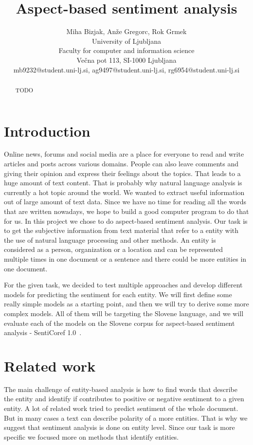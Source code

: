 \documentclass[11pt,a4paper]{article}
\title{Aspect-based sentiment analysis}
\author{
    Miha Bizjak, Anže Gregorc, Rok Grmek \\
    University of Ljubljana \\
    Faculty for computer and information science \\
    Večna pot 113, SI-1000 Ljubljana \\
    mb9232@student.uni-lj.si, ag9497@student.uni-lj.si, rg6954@student.uni-lj.si
}
\date{}
\begin{document}
\maketitle



\begin{abstract}
    TODO
\end{abstract}



\section{Introduction}

Online news, forums and social media are a place for everyone to read and write articles and posts across various domains. 
People can also leave comments and giving their opinion and express their feelings about the topics. 
That leads  to a huge amount of text content. 
That is probably why natural language analysis is currently a hot topic around the world.
We wanted to extract useful information out of large amount of text data. Since we have no time for reading all the words that are written nowadays, we hope to build a good computer program to do that for us.
In this project we chose to do aspect-based sentiment analysis. 
Our task is to get the subjective information from text material that refer to a entity with the use of natural language processing and other methods. 
An entity is considered as a person, organization or a location and can be represented multiple times in one document or a sentence and there could be more entities in one document.

For the given task, we decided to test multiple approaches and develop different models for predicting the sentiment for each entity.
We will first define some really simple models as a starting point, and then we will try to derive some more complex models.
All of them will be targeting the Slovene language, and we will evaluate each of the models on the Slovene corpus for aspect-based sentiment analysis - SentiCoref 1.0~\cite{zitnik2019slovene}.



\section{Related work}

The main challenge of entity-based analysis is how to find words that describe the entity and identify if contributes to positive or negative sentiment to a given entity. 
A lot of related work tried to predict sentiment of the whole document. 
But in many cases a text can describe polarity of a more entities. 
That is why we suggest that sentiment analysis is done on entity level.
Since our task is more specific we focused more on methods that identify entities.
\end{document}
